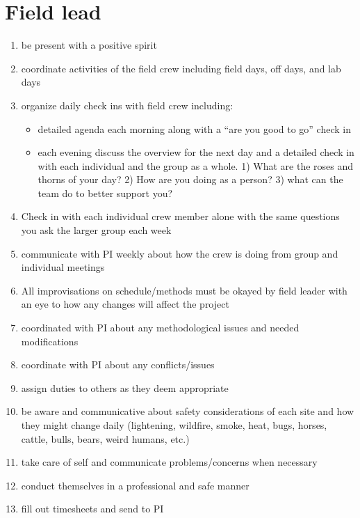\documentclass[12pt]{article}
\begin{document}
\section{Field lead}
\begin{enumerate}
\item be present with a positive spirit
\item coordinate activities of the field crew including field days,
  off days, and lab days
\item organize daily check ins with field crew including:
  \begin{itemize}
  \item detailed agenda each morning along with a ``are you good to
    go'' check in
  \item each evening discuss the overview for the next day and a
    detailed check in with each individual and the group as a whole. 1)
    What are the roses and thorns of your day? 2) How are you doing as
    a person? 3) what can the team do to better support you?
  \end{itemize}
\item Check in with each individual crew member alone with the same
  questions you ask the larger group each week
\item communicate with PI weekly about how the crew is doing from group
  and individual meetings
\item All improvisations on schedule/methods must be okayed by field
  leader with an eye to how any changes will affect the project
\item coordinated with PI about any methodological issues and needed
  modifications
\item coordinate with PI about any conflicts/issues 
\item assign duties to others as they deem appropriate
\item be aware and communicative about safety considerations of each
  site and how they might change daily (lightening, wildfire, smoke,
  heat, bugs, horses, cattle, bulls, bears, weird humans, etc.)
\item take care of self and communicate problems/concerns when
  necessary
\item conduct themselves in a professional and safe manner
\item fill out timesheets and send to PI
\end{enumerate}
\end{document}
